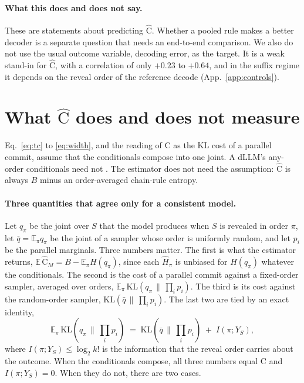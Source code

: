 \documentclass{article}
\newcommand{\C}{\mathrm{C}}
\newcommand{\Chat}{\widehat{\C}}
\begin{document}
\paragraph{What this does and does not say.} These are statements about predicting
$\Chat$. Whether a pooled rule makes a better decoder is a separate question that needs
an end-to-end comparison. We also do not use the usual outcome variable, decoding error,
as the target. It is a weak stand-in for $\Chat$, with a correlation of only $+0.23$ to $+0.64$, and in the suffix
regime it depends on the reveal order of the reference decode (App.~\ref{app:controls}).



\section{What $\Chat$ does and does not measure}
\label{sec:meaning}

Eq.~\eqref{eq:tc} to \eqref{eq:width}, and the reading of $\C$ as the KL cost of a
parallel commit, assume that the conditionals compose into one joint. A dLLM's any-order
conditionals need not \cite{mlminconsist}. The estimator does not need the assumption:
$\Chat$ is always $B$ minus an order-averaged chain-rule entropy.

\paragraph{Three quantities that agree only for a consistent model.} Let $q_\pi$ be the
joint over $S$ that the model produces when $S$ is revealed in order $\pi$, let
$\bar q=\mathbb{E}_\pi q_\pi$ be the joint of a sampler whose order is uniformly random,
and let $p_i$ be the parallel marginals. Three numbers matter. The first is what the
estimator returns, $\mathbb{E}\,\Chat_M=B-\mathbb{E}_\pi H(q_\pi)$, since each
$\hat H_\pi$ is unbiased for $H(q_\pi)$ whatever the conditionals. The second is the
cost of a parallel commit against a fixed-order sampler, averaged over orders,
$\mathbb{E}_\pi\,\mathrm{KL}(q_\pi\,\|\,\prod_i p_i)$. The third is its cost against the
random-order sampler, $\mathrm{KL}(\bar q\,\|\,\prod_i p_i)$.
The last two are tied by an exact identity,
\begin{equation}
  \mathbb{E}_\pi\,\mathrm{KL}(q_\pi\,\|\,\textstyle\prod_i p_i)
  \;=\;\mathrm{KL}(\bar q\,\|\,\textstyle\prod_i p_i)\;+\;I(\pi;Y_S),
  \label{eq:orderinfo}
\end{equation}
where $I(\pi;Y_S)\le\log_2 k!$ is the information that the reveal order carries about
the outcome. When the conditionals compose, all three numbers equal $\C$ and
$I(\pi;Y_S)=0$. When they do not, there are two cases.
\end{document}
